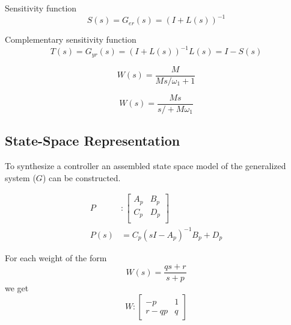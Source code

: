 Sensitivity function
\begin{equation*}
    S(s)=G_{er}(s) = {(I+L(s))}^{-1}
\end{equation*}

Complementary sensitivity function
\begin{equation*}
    T(s) = G_{yr}(s)={(I+L(s))}^{-1}L(s) = I-S(s)
\end{equation*}



\begin{equation*}
    W(s) = \frac{M}{Ms/\omega_1 + 1}
\end{equation*}

\begin{equation*}
    W(s) = \frac{Ms}{s/+M\omega_1}
\end{equation*}

\subsection{State-Space Representation}
To synthesize a controller an assembled state space model of the generalized system ($G$) can be constructed.

\begin{align*}
    P    & : \left[
        \begin{array}{c|c} %
            A_p & B_p \\
            \hline %
            C_p & D_p \\
        \end{array}
    \right]                            \\
    P(s) & = {C_p(sI-A_p)}^{-1}B_p+D_p
\end{align*}


For each weight of the form
\begin{equation*}
    W(s) = \frac{qs+r}{s+p}
\end{equation*}
we get
\begin{equation*}
    W : \left[
        \begin{array}{c|c} %
            -p   & 1 \\
            \hline %
            r-qp & q
        \end{array}
        \right]
\end{equation*}


